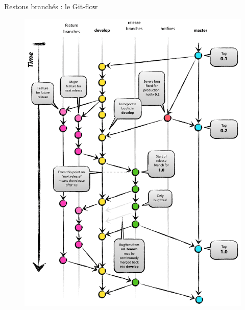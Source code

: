 \documentclass[xcolor=x11names,compress]{beamer}
\begin{document}
\begin{frame}{Restons branchés : le Git-flow}
\begin{figure}[H]
{		\includegraphics[height=1.1\textheight]{images/2-workflow/gitflow.png}
		}
	\end{figure}
\end{frame}
\end{document}

